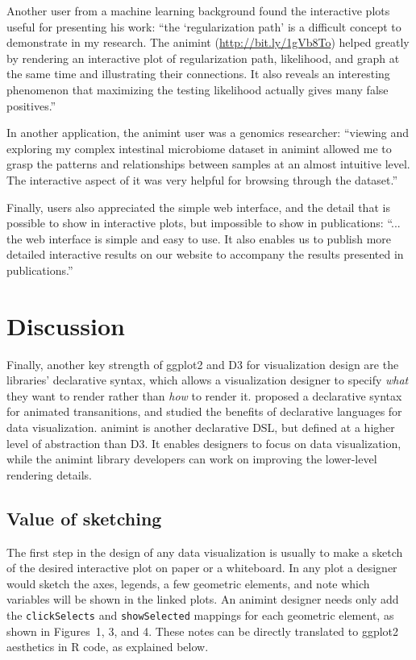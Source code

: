 \documentclass[journal]{vgtc}\usepackage[]{graphicx}\usepackage[]{color}
\begin{document}
Another user from a machine learning background found the interactive
plots useful for presenting his work: ``the `regularization path' is a
difficult concept to demonstrate in my research. The animint
(\url{http://bit.ly/1gVb8To}) helped greatly by rendering an
interactive plot of regularization path, likelihood, and graph at the
same time and illustrating their connections. It also reveals an
interesting phenomenon that maximizing the testing likelihood actually
gives many false positives.''

In another application, the animint user was a genomics researcher:
``viewing and exploring my complex intestinal microbiome dataset in
animint allowed me to grasp the patterns and relationships between
samples at an almost intuitive level. The interactive aspect of it was
very helpful for browsing through the dataset.''

Finally, users also appreciated the simple web interface, and the
detail that is possible to show in interactive plots, but impossible
to show in publications: ``...  the web interface is simple and easy
to use.  It also enables us to publish more detailed interactive
results on our website to accompany the results presented in
publications.''

\section{Discussion}

Finally, another key strength of ggplot2 and D3 for visualization
design are the libraries' declarative syntax, which allows a
visualization designer to specify \emph{what} they want to render
rather than \emph{how} to render it. \citet{declarative} proposed a
declarative syntax for animated transanitions, and studied the
benefits of declarative languages for data visualization. animint is
another declarative DSL, but defined at a higher level of abstraction
than D3. It enables designers to focus on data visualization, while
the animint library developers can work on improving the lower-level
rendering details.

\subsection{Value of sketching}

The first step in the design of any data visualization is usually to
make a sketch of the desired interactive plot on paper or a
whiteboard.  In any plot a designer would sketch the axes, legends, a
few geometric elements, and note which variables will be shown in the
linked plots. An animint designer needs only add the
\texttt{clickSelects} and \texttt{showSelected} mappings for
each geometric element, as shown in Figures~1, 3, and 4. These notes
can be directly translated to ggplot2 aesthetics in R code, as
explained below.
\end{document}

